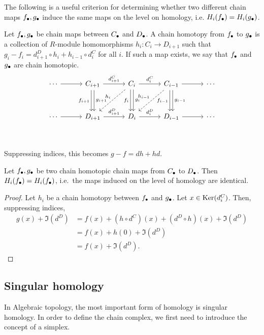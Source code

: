 The following is a useful criterion for determining whether two different chain maps $f_\bullet, g_\bullet$ induce the same maps on the level on homology, i.e. $H_i(f_\bullet) = H_i(g_\bullet)$.
\begin{definition}
    Let $f_\bullet, g_\bullet$ be chain maps between  $C_\bullet$ and $D_\bullet$.
    A chain homotopy from  $f_\bullet$ to  $g_\bullet$ is a collection of  $R$-module homomorphisms $h_i: C_i \to  D_{i+1}$ such that $g_i - f_i = d^{D}_{i+1}  \circ  h_i + h_{i-1}  \circ  d_i^{C}$ for all $i$.
    If such a map exists, we say that $f_\bullet$ and  $g_\bullet$ are chain homotopic.
    \[
        \begin{tikzcd}[column sep=3em, row sep=3em]
            \cdots  \arrow[r, ""]&
            C_{i+1} \arrow[r, "d_{i+1}^{C}"] \arrow[d, "f_{i+1}"', shift right=2pt] \arrow[d, "g_{i+1}", shift left=2pt]&
            C_{i} \arrow[r, "d_{i}^{C}"] \arrow[d, "f_i"', shift right=2pt] \arrow[d, "g_{i}", shift left=2pt] \arrow[dl, "h_i"', dashed]&
            C_{i-1} \arrow[r, ""] \arrow[d, "f_{i-1}"', shift right=2pt]\arrow[d, "g_{i-1}", shift left=2pt] \arrow[dl, "h_{i-1}"', dashed]&
            \cdots \\
            \cdots  \arrow[r, ""]&
            D_{i+1} \arrow[r, "d_{i+1}^{D}"] &
            D_{i} \arrow[r, "d_{i}^{D}"] &
            D_{i-1} \arrow[r, ""] &
            \cdots \\
        \end{tikzcd}
    \]
    Suppressing indices, this becomes $g - f = dh + hd$.
\end{definition}
\begin{prop}
    Let $f_\bullet, g_\bullet$ be two chain homotopic chain maps from $C_\bullet$ to $D_\bullet$. 
    Then $H_i(f_\bullet) = H_i(f_\bullet)$, i.e.\ the maps induced on the level of homology are identical.
\end{prop}
\begin{proof}
    Let $h_i$ be a chain homotopy between  $f_\bullet$ and  $g_\bullet$.
    Let $x \in \operatorname{Ker}(d_i^{C})$.
    Then, suppressing indices,
    \begin{align*}
        g(x) + \Im(d^{D}) &= f(x) + (h  \circ  d^{C})(x) + (d^{D}  \circ h)(x)  + \Im(d^{D})\\
                          &= f(x) + h(0) + \Im(d^{D})\\
                        &= f(x) + \Im(d^{D}).
    \end{align*} 
\end{proof}

\subsection*{Singular homology}
In Algebraic topology, the most important form of homology is singular homology.
In order to define the chain complex, we first need to introduce the concept of a simplex.

